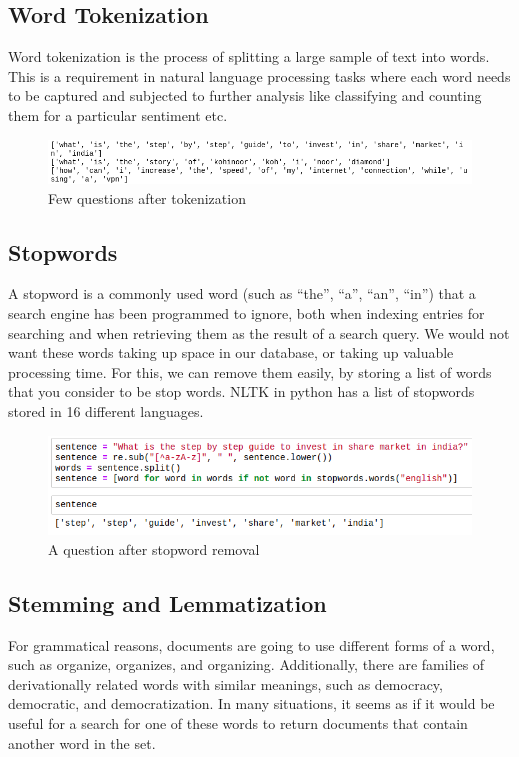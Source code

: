 \subsection{Word Tokenization}
Word tokenization is the process of splitting a large sample of text into words. This is a requirement in natural language processing tasks where each word needs to be captured and subjected to further analysis like classifying and counting them for a particular sentiment etc.

\begin{figure}[tbh]
\begin{center}
	\includegraphics[width = 5.5in]{images/tokenization.png}
	\caption{Few questions after tokenization}
	\label{tokenization}
\end{center}
\end{figure}

\subsection{Stopwords}
A stopword is a commonly used word (such as “the”, “a”, “an”, “in”) that a search engine has been programmed to ignore, both when indexing entries for searching and when retrieving them as the result of a search query. We would not want these words taking up space in our database, or taking up valuable processing time. For this, we can remove them easily, by storing a list of words that you consider to be stop words. \ac{NLTK} in python has a list of stopwords stored in 16 different languages.
\begin{figure}[tbh]
\begin{center}
	\includegraphics[width = 5.5in]{images/stopwords.png}
	\caption{A question after stopword removal}
	\label{stopwords}
\end{center}
\end{figure}

\subsection{Stemming and Lemmatization}
For grammatical reasons, documents are going to use different forms of a word, such as organize, organizes, and organizing. Additionally, there are families of derivationally related words with similar meanings, such as democracy, democratic, and democratization. In many situations, it seems as if it would be useful for a search for one of these words to return documents that contain another word in the set.


